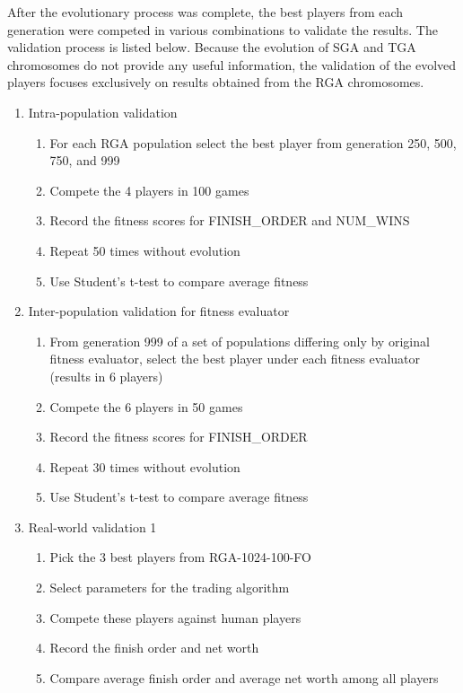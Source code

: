 After the evolutionary process was complete, the best players from each
generation were competed in various combinations to validate the results. The
validation process is listed below. Because the evolution of SGA and TGA
chromosomes do not provide any useful information, the validation of the evolved
players focuses exclusively on results obtained from the RGA chromosomes.

\begin{enumerate}
  \item {Intra-population validation}
  \begin{enumerate}
    \item {For each RGA population select the best player from generation 250,
    500, 750, and 999}
    \item {Compete the 4 players in 100 games}
    \item {Record the fitness scores for FINISH\_ORDER and NUM\_WINS}
    \item {Repeat 50 times without evolution}
    \item {Use Student's t-test to compare average fitness}
  \end{enumerate}
  \item {Inter-population validation for fitness evaluator}
  \begin{enumerate}
    \item {From generation 999 of a set of populations differing only by
    original fitness evaluator, select the best player under each fitness
    evaluator (results in 6 players)}
    \item {Compete the 6 players in 50 games}
    \item {Record the fitness scores for FINISH\_ORDER}
    \item {Repeat 30 times without evolution}
    \item {Use Student's t-test to compare average fitness}
  \end {enumerate}
  \item {Real-world validation 1}
  \begin{enumerate}
    \item {Pick the 3 best players from RGA-1024-100-FO}
    \item {Select parameters for the trading algorithm}
    \item {Compete these players against human players}   
    \item {Record the finish order and net worth}
    \item {Compare average finish order and average net worth among all players}

\end{enumerate}
\end{enumerate}
